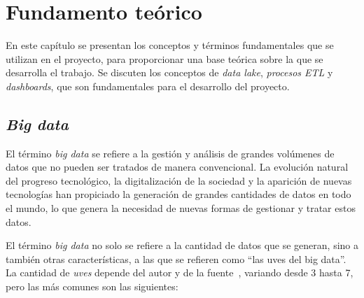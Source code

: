 \chapter{Fundamento teórico}\label{chap:teo}
En este capítulo se presentan los conceptos y términos fundamentales que se
utilizan en el proyecto, para proporcionar una base teórica sobre la que se
desarrolla el trabajo. Se discuten los conceptos de \textit{data lake},
\textit{procesos ETL} y \textit{dashboards}, que son fundamentales para el
desarrollo del proyecto.

\section{\textit{Big data}}\label{sec:bigdata}
El término \textit{big data} se refiere a la gestión y análisis de grandes
volúmenes de datos que no pueden ser tratados de manera convencional. La
evolución natural del progreso tecnológico, la digitalización de la sociedad y
la aparición de nuevas tecnologías han propiciado la generación de grandes
cantidades de datos en todo el mundo, lo que genera la necesidad de nuevas
formas de gestionar y tratar estos datos.

El término \textit{big data} no solo se refiere a la cantidad de datos que se
generan, sino a también otras características, a las que se refieren como ``las
uves del big data''. La cantidad de \textit{uves} depende del autor y de la
fuente~\cite{ishwarappa2015vs,sagiroglu2013bigdata}, variando desde 3 hasta 7,
pero las más comunes son las siguientes:


